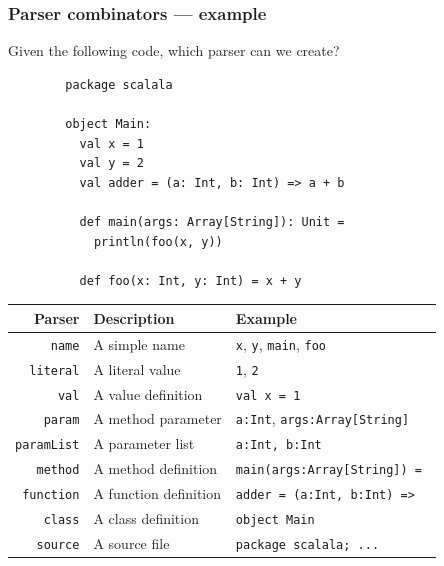 \begin{frame}[fragile]
  \frametitle{Parser combinators --- example}

  \begin{overprint}
    Given the following code, which parser can we create?
    \begin{example}
      \begin{lstlisting}
        package scalala
  
        object Main:
          val x = 1
          val y = 2
          val adder = (a: Int, b: Int) => a + b
  
          def main(args: Array[String]): Unit =
            println(foo(x, y))
  
          def foo(x: Int, y: Int) = x + y
      \end{lstlisting}
    \end{example}

    \begin{table}
      \centering
      \begin{tabular}{rll}
        \toprule
        \textbf{Parser}    & \textbf{Description}  & \textbf{Example}                                    \\
        \midrule
        \texttt{name}      & A simple name         & \texttt{x}, \texttt{y}, \texttt{main}, \texttt{foo} \\
        \texttt{literal}   & A literal value       & \texttt{1}, \texttt{2}                              \\
        \texttt{val}       & A value definition    & \texttt{val x = 1}                                  \\
        \texttt{param}     & A method parameter    & \texttt{a:Int}, \texttt{args:Array[String]}         \\
        \texttt{paramList} & A parameter list      & \texttt{a:Int, b:Int}                               \\
        \texttt{method}    & A method definition   & \texttt{main(args:Array[String]) = }                \\
        \texttt{function}  & A function definition & \texttt{adder = (a:Int, b:Int) => }                 \\
        \texttt{class}     & A class definition    & \texttt{object Main}                                \\
        \texttt{source}    & A source file         & \texttt{package scalala; ...}                       \\
        \bottomrule
      \end{tabular}
    \end{table}


\end{overprint}
\end{frame}
